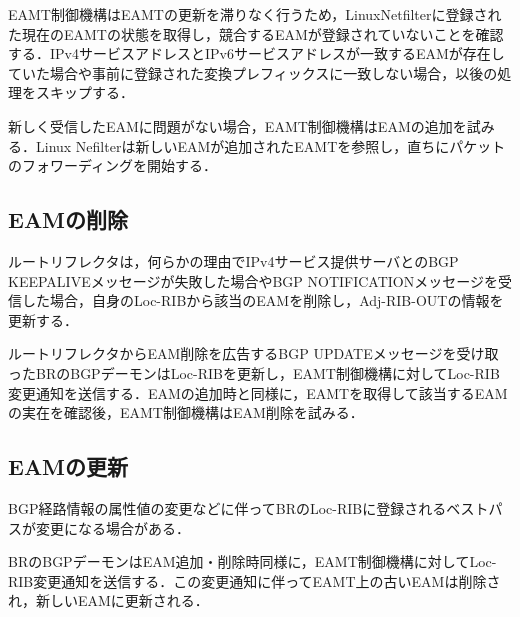 EAMT制御機構はEAMTの更新を滞りなく行うため，LinuxNetfilterに登録された現在のEAMTの状態を取得し，競合するEAMが登録されていないことを確認する．IPv4サービスアドレスとIPv6サービスアドレスが一致するEAMが存在していた場合や事前に登録された変換プレフィックスに一致しない場合，以後の処理をスキップする．

新しく受信したEAMに問題がない場合，EAMT制御機構はEAMの追加を試みる．Linux Nefilterは新しいEAMが追加されたEAMTを参照し，直ちにパケットのフォワーディングを開始する．

\subsection{EAMの削除}
ルートリフレクタは，何らかの理由でIPv4サービス提供サーバとのBGP KEEPALIVEメッセージが失敗した場合やBGP NOTIFICATIONメッセージを受信した場合，自身のLoc-RIBから該当のEAMを削除し，Adj-RIB-OUTの情報を更新する．

ルートリフレクタからEAM削除を広告するBGP UPDATEメッセージを受け取ったBRのBGPデーモンはLoc-RIBを更新し，EAMT制御機構に対してLoc-RIB変更通知を送信する．EAMの追加時と同様に，EAMTを取得して該当するEAMの実在を確認後，EAMT制御機構はEAM削除を試みる．

\subsection{EAMの更新}
BGP経路情報の属性値の変更などに伴ってBRのLoc-RIBに登録されるベストパスが変更になる場合がある．

BRのBGPデーモンはEAM追加・削除時同様に，EAMT制御機構に対してLoc-RIB変更通知を送信する．この変更通知に伴ってEAMT上の古いEAMは削除され，新しいEAMに更新される．




